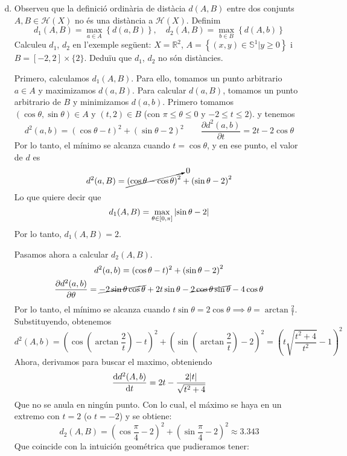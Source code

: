 \documentclass[12pt]{article}
\newcommand{\h}{\mathscr{H}}
\newcommand\setb[1]{\left\{#1\right\}}
\theoremstyle{break}
\begin{document}
\begin{enumerate}[a)] \setcounter{enumi}{3}
\item Observeu que la definició ordinària de distàcia $d(A,B)$
	entre dos conjunts $A, B \in \h(X)$ no és una distància a
	$\h(X)$. Definim
	\[
		d_1(A, B) = \max_{a \in A} \setb{d(a, B)}, \quad d_2(A, B)
		= \max_{b \in B} \setb{d(A, b)}
	\]
	Calculeu $d_1$, $d_2$ en l'exemple següent: $X = \mathbb{R}^2$,
	$A = \setb{(x, y) \in \mathbb{S}^1 \vert y \geq 0}$ i
	$B = [-2, 2] \times \{2\}$. Deduïu que $d_1$, $d_2$ no són
	distàncies.


	Primero, calculamos $d_1(A, B)$. Para ello, tomamos un punto
	arbitrario $a \in A$ y maximizamos $d(a, B)$. Para calcular
	$d(a, B)$, tomamos un punto arbitrario de $B$ y minimizamos
	$d(a, b)$. Primero tomamos
	$(\cos \theta, \sin \theta) \in A$ y $(t, 2) \in B$ (con
	$\pi \leq \theta \leq 0$ y $-2 \leq t \leq 2$). y tenemos
	\[
		d^2(a, b) = \left( \cos \theta - t \right)^2 + \left( \sin
		\theta -2 \right)^2 \qquad \frac{\partial d^2(a,
		b)}{\partial t} = 2t - 2\cos \theta
	\]
	Por lo tanto, el mínimo se alcanza cuando $t = \cos \theta$,
	y en ese punto, el valor de $d$ es
	\[
		d^2(a, B) = \cancelto{0}{\left( \cos \theta - \cos \theta
		\right)^2} + \left( \sin \theta - 2 \right)^2
	\]
	Lo que quiere decir que
	\[
		d_1(A, B) = \max_{\theta \in [0, \pi]} \abs{\sin \theta -
		2}
	\]
	Por lo tanto, $d_1(A, B) = 2$.

	Pasamos ahora a calcular $d_2(A, B)$.
	\begin{gather*}
		d^2(a, b) = (\cos \theta - t)^2 + \left( \sin \theta - 2 \right)^2 \\
		\frac{\partial d^2(a, b)}{\partial \theta} =
		\cancel{-2\sin \theta \cos \theta} + 2t\sin \theta -
		\cancel{2\cos\theta\sin\theta} - 4 \cos \theta
	\end{gather*}
	Por lo tanto, el mínimo se alcanza cuando
	$t \sin \theta = 2 \cos \theta \implies \theta = \arctan
	\frac{2}{t}$. Substituyendo, obtenemos
	\[
		d^2(A, b) = \left( \cos \left( \arctan \frac{2}{t} \right)
		- t \right)^2 + \left( \sin \left( \arctan \frac{2}{t}
		\right) - 2 \right)^2 = \left( t
		\sqrt{\frac{t^2+4}{t^2}} - 1 \right)^2
	\]
	Ahora, derivamos para buscar el maximo, obteniendo
	\[
		\dv{d^2(A, b)}{t} = 2t - \frac{2 \abs{t}}{\sqrt{t^2+4}}
	\]
	Que no se anula en ningún punto. Con lo cual, el máximo se
	haya en un extremo con $t = 2$ (o $t = -2$) y se obtiene:
	\[
		d_2(A, B) = \left( \cos \frac{\pi}{4} - 2\right)^2 +
		\left( \sin \frac{\pi}{4} - 2 \right)^2 \approx 3.343
	\]
	Que coincide con la intuición geométrica que pudieramos
	tener:
	\begin{center}
\end{center}
\end{enumerate}
\end{document}
